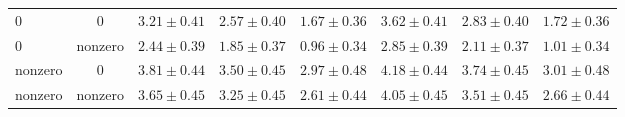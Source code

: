 \documentclass[a4paper,fleqn,usenatbib]{mnras}
\begin{document}
\begin{table*}
\begin{tabular}{@{}lccccccc}
\hline
 0         &0          &$3.21\pm0.41$    & $ 2.57\pm0.40$  &$1.67\pm0.36$   & $3.62\pm0.41$      &$2.83\pm0.40$    &$1.72\pm0.36$     \\
 0         & nonzero   &$2.44\pm0.39$    &$1.85\pm 0.37$   & $0.96\pm0.34$  & $2.85\pm0.39$      &$2.11\pm 0.37$    &$1.01\pm0.34$     \\    
nonzero    & 0         &$3.81\pm0.44$   &$3.50\pm0.45$   & $2.97\pm0.48$ &$4.18\pm0.44$       &$3.74\pm0.45$    &$3.01\pm0.48$     \\
nonzero    & nonzero   &$3.65\pm0.45$   &$3.25\pm0.45$   &$ 2.61\pm0.44$   &$4.05\pm0.45$       &$3.51\pm0.45$    &$2.66\pm0.44$     \\
  \hline 

\end{tabular}
\end{table*}
\end{document}

